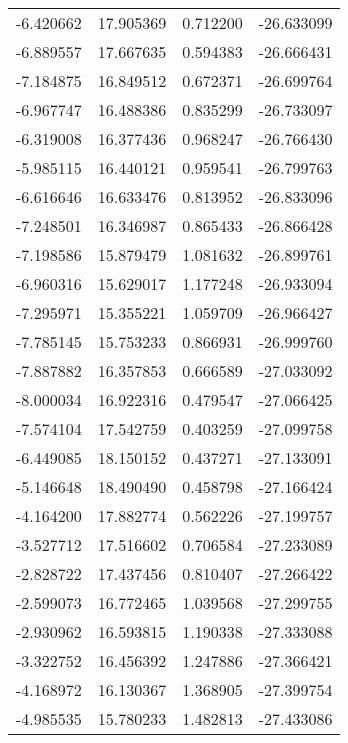 \begin{tabular}{rrrr}
       -6.420662 &        17.905369 &    0.712200 & -26.633099 \\
       -6.889557 &        17.667635 &    0.594383 & -26.666431 \\
       -7.184875 &        16.849512 &    0.672371 & -26.699764 \\
       -6.967747 &        16.488386 &    0.835299 & -26.733097 \\
       -6.319008 &        16.377436 &    0.968247 & -26.766430 \\
       -5.985115 &        16.440121 &    0.959541 & -26.799763 \\
       -6.616646 &        16.633476 &    0.813952 & -26.833096 \\
       -7.248501 &        16.346987 &    0.865433 & -26.866428 \\
       -7.198586 &        15.879479 &    1.081632 & -26.899761 \\
       -6.960316 &        15.629017 &    1.177248 & -26.933094 \\
       -7.295971 &        15.355221 &    1.059709 & -26.966427 \\
       -7.785145 &        15.753233 &    0.866931 & -26.999760 \\
       -7.887882 &        16.357853 &    0.666589 & -27.033092 \\
       -8.000034 &        16.922316 &    0.479547 & -27.066425 \\
       -7.574104 &        17.542759 &    0.403259 & -27.099758 \\
       -6.449085 &        18.150152 &    0.437271 & -27.133091 \\
       -5.146648 &        18.490490 &    0.458798 & -27.166424 \\
       -4.164200 &        17.882774 &    0.562226 & -27.199757 \\
       -3.527712 &        17.516602 &    0.706584 & -27.233089 \\
       -2.828722 &        17.437456 &    0.810407 & -27.266422 \\
       -2.599073 &        16.772465 &    1.039568 & -27.299755 \\
       -2.930962 &        16.593815 &    1.190338 & -27.333088 \\
       -3.322752 &        16.456392 &    1.247886 & -27.366421 \\
       -4.168972 &        16.130367 &    1.368905 & -27.399754 \\
       -4.985535 &        15.780233 &    1.482813 & -27.433086 \\

\end{tabular}
